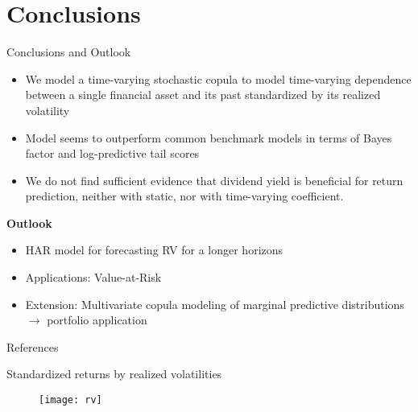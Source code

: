 \documentclass[9pt,xcolor=x11names,compress]{beamer}
\let\oldcite=\cite
\renewcommand{\cite}[1]{\textcolor{dblue}{\oldcite{#1}}}
\begin{document}
\section{Conclusions}
\begin{frame}{Conclusions and Outlook}
	\begin{itemize}
		\item We model a time-varying stochastic copula to model time-varying dependence between a single financial asset and its past standardized by its realized volatility
		\item Model seems to outperform common benchmark models in terms of Bayes factor and log-predictive tail scores
		\item We do not find sufficient evidence that dividend yield is beneficial for return prediction, neither with static, nor with time-varying coefficient. %
	\end{itemize}
\pause
	\textbf{Outlook}
	\begin{itemize}
		\item HAR model for forecasting RV for a longer horizons
		\item Applications: Value-at-Risk 
		\item Extension: Multivariate copula modeling of marginal predictive distributions $\to$ portfolio application
	\end{itemize}
\end{frame}

\begin{frame}{References}
	\fontsize{5.5}{1}\selectfont{
		\setlength{\bibsep}{1\baselineskip}
		
		}
\end{frame}

\appendix
{}
\setcounter{finalframe}{\value{framenumber}}


\begin{frame}[plain]{Standardized returns by realized volatilities}\label{sampling}
	\begin{figure}
		\centering
		\texttt{[image: rv]}
	\end{figure}

\hyperlink{rv}{}
\end{frame}
\setcounter{framenumber}{\value{finalframe}}
\end{document}
